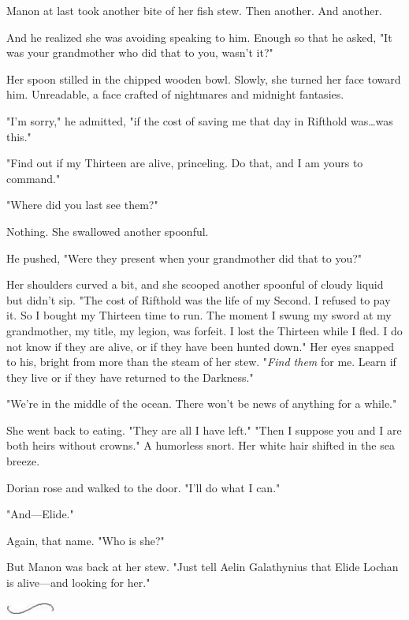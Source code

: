 Manon at last took another bite of her fish stew.
Then another.
And another.

And he realized she was avoiding speaking to him.
Enough so that he asked, "It was your grandmother who did that to you, wasn't it?"

Her spoon stilled in the chipped wooden bowl.
Slowly, she turned her face toward him.
Unreadable, a face crafted of nightmares and midnight fantasies.

"I'm sorry," he admitted, "if the cost of saving me that day in Rifthold was\ldots was this."

"Find out if my Thirteen are alive, princeling.
Do that, and I am yours to command."

"Where did you last see them?"

Nothing.
She swallowed another spoonful.

He pushed, "Were they present when your grandmother did that to you?"

Her shoulders curved a bit, and she scooped another spoonful of cloudy liquid but didn't sip.
"The cost of Rifthold was the life of my Second.
I refused to pay it.
So I bought my Thirteen time to run.
The moment I swung my sword at my grandmother, my title, my legion, was forfeit.
I lost the Thirteen while I fled.
I do not know if they are alive, or if they have been hunted down."
Her eyes snapped to his, bright from more than the steam of her stew.
"\emph{Find them} for me.
Learn if they live or if they have returned to the Darkness."

"We're in the middle of the ocean.
There won't be news of anything for a while."

She went back to eating.
"They are all I have left."
"Then I suppose you and I are both heirs without crowns."
A humorless snort.
Her white hair shifted in the sea breeze.

Dorian rose and walked to the door.
"I'll do what I can."

"And---Elide."

Again, that name.
"Who is she?"

But Manon was back at her stew.
"Just tell Aelin Galathynius that Elide Lochan is alive---and looking for her."

\begin{center}
	\includegraphics[width=0.65in,height=0.13in]{images/seperator}
\end{center}

